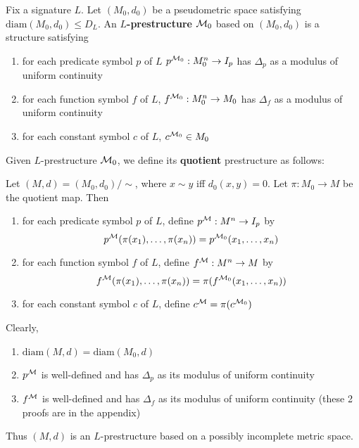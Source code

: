 \documentclass[11pt]{article}
\def \diam {\text{diam}}
\begin{document}
Fix a signature \(L\). Let \((M_0,d_0)\) be a pseudometric space
satisfying \(\diam(M_0,d_0)\le D_L\). An \textbf{\(L\)-prestructure} \(\mathcal{M}_0\) based on \((M_0,d_0)\) is a
structure satisfying
\begin{enumerate}
\item for each predicate symbol \(p\) of \(L\) \(p^{\mathcal{M}_0}:M_0^n\to I_p\) has \(\Delta_p\) as a
modulus of uniform continuity
\item for each function symbol \(f\) of \(L\), \(f^{\mathcal{M}_0}:M_0^n\to M_0\) has \(\Delta_f\) as a modulus
of uniform continuity
\item for each constant symbol \(c\) of  \(L\), \(c^{\mathcal{M}_0}\in M_0\)
\end{enumerate}


Given \(L\)-prestructure \(\mathcal{M}_0\), we define its \textbf{quotient} prestructure as follows:

Let \((M,d)=(M_0,d_0)/\sim\), where \(x\sim y\) iff \(d_0(x,y)=0\). Let \(\pi:M_0\to M\) be the
quotient map. Then
\begin{enumerate}
\item for each predicate symbol \(p\) of \(L\), define \(p^{\mathcal{M}}:M^n\to I_p\) by
  \begin{equation*}
p^{\mathcal{M}}(\pi(x_1),\dots,\pi(x_n))=p^{\mathcal{M}_0}(x_1,\dots,x_n)
  \end{equation*}
\item for each function symbol \(f\) of \(L\), define \(f^{\mathcal{M}}:M^n\to M\) by
  \begin{equation*}
f^{\mathcal{M}}(\pi(x_1),\dots,\pi(x_n))=\pi(f^{\mathcal{M}_0}(x_1,\dots,x_n))
  \end{equation*}
\item for each constant symbol \(c\) of \(L\), define \(c^{\mathcal{M}}=\pi(c^{\mathcal{M}_0})\)
\end{enumerate}


Clearly,
\begin{enumerate}
\item \(\diam(M,d)=\diam(M_0,d)\)
\item \(p^{\mathcal{M}}\) is well-defined and has \(\Delta_p\) as its modulus of uniform continuity
\item \(f^{\mathcal{M}}\) is well-defined and has \(\Delta_f\) as its modulus of uniform continuity (these
2 proofs are in the appendix)
\end{enumerate}


Thus \((M,d)\) is an \(L\)-prestructure based on a possibly incomplete metric space.
\end{document}
